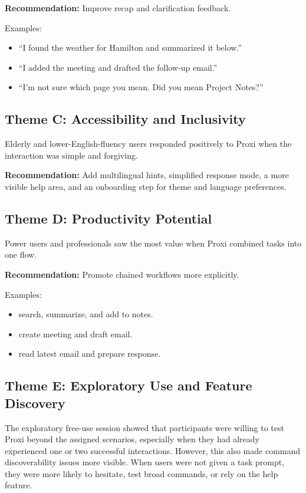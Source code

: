 \documentclass[12pt, titlepage]{article}
\begin{document}
\textbf{Recommendation:} Improve recap and clarification feedback.

Examples:
\begin{itemize}
    \item ``I found the weather for Hamilton and summarized it below.''
    \item ``I added the meeting and drafted the follow-up email.''
    \item ``I'm not sure which page you mean. Did you mean Project
    Notes?''
\end{itemize}

\subsection{Theme C: Accessibility and Inclusivity}

Elderly and lower-English-fluency users responded positively to Proxi
when the interaction was simple and forgiving.

\textbf{Recommendation:} Add multilingual hints, simplified response
mode, a more visible help area, and an onboarding step for theme and
language preferences.

\subsection{Theme D: Productivity Potential}

Power users and professionals saw the most value when Proxi combined
tasks into one flow.

\textbf{Recommendation:} Promote chained workflows more explicitly.

Examples:
\begin{itemize}
    \item search, summarize, and add to notes.
    \item create meeting and draft email.
    \item read latest email and prepare response.
\end{itemize}

\subsection{Theme E: Exploratory Use and Feature Discovery}

The exploratory free-use session showed that participants were willing
to test Proxi beyond the assigned scenarios, especially when they had
already experienced one or two successful interactions. However, this
also made command discoverability issues more visible. When users were
not given a task prompt, they were more likely to hesitate, test broad
commands, or rely on the help feature.
\end{document}
